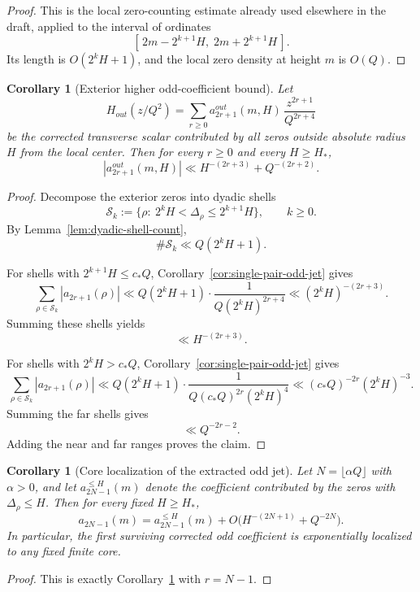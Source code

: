\documentclass[11pt,a4paper]{amsart}
\def\out{out}%
\theoremstyle{plain}
\newtheorem{corollary}[theorem]{Corollary}
\theoremstyle{definition}
\newcommand{\out}{\mathrm{out}}
\begin{document}
\begin{proof}
This is the local zero-counting estimate already used elsewhere in the draft,
applied to the interval of ordinates
\[
[\,2m-2^{k+1}H,\;2m+2^{k+1}H\,].
\]
Its length is $O(2^kH+1)$, and the local zero density at height $m$ is
$O(Q)$.
\end{proof}

\begin{corollary}[Exterior higher odd-coefficient bound]
\label{cor:outside-higher-odd-jets}
Let
\[
H_{\out}(z/Q^2)
=
\sum_{r\ge 0} a_{2r+1}^{\out}(m,H)\,\frac{z^{2r+1}}{Q^{2r+4}}
\]
be the corrected transverse scalar contributed by all zeros outside absolute
radius $H$ from the local center. Then for every $r\ge 0$ and every
$H\ge H_*$,
\[
\boxed{
|a_{2r+1}^{\out}(m,H)|
\ll
H^{-(2r+3)}+Q^{-(2r+2)}.
}
\]
\end{corollary}

\begin{proof}
Decompose the exterior zeros into dyadic shells
\[
\mathcal S_k:=\{\rho:\ 2^kH<\Delta_\rho\le 2^{k+1}H\},
\qquad k\ge 0.
\]
By Lemma~\ref{lem:dyadic-shell-count},
\[
\#\mathcal S_k\ll Q(2^kH+1).
\]

For shells with $2^{k+1}H\le c_*Q$, Corollary~\ref{cor:single-pair-odd-jet}
gives
\[
\sum_{\rho\in\mathcal S_k}|a_{2r+1}(\rho)|
\ll
Q(2^kH+1)\cdot \frac{1}{Q(2^kH)^{2r+4}}
\ll
(2^kH)^{-(2r+3)}.
\]
Summing these shells yields
\[
\ll H^{-(2r+3)}.
\]

For shells with $2^kH>c_*Q$, Corollary~\ref{cor:single-pair-odd-jet} gives
\[
\sum_{\rho\in\mathcal S_k}|a_{2r+1}(\rho)|
\ll
Q(2^kH+1)\cdot \frac{1}{Q(c_*Q)^{2r}(2^kH)^4}
\ll
(c_*Q)^{-2r}(2^kH)^{-3}.
\]
Summing the far shells gives
\[
\ll
Q^{-2r-2}.
\]
Adding the near and far ranges proves the claim.
\end{proof}

\begin{corollary}[Core localization of the extracted odd jet]
\label{cor:extracted-odd-jet-core-localization}
Let $N=\lfloor \alpha Q\rfloor$ with $\alpha>0$, and let
$a_{2N-1}^{\le H}(m)$ denote the coefficient contributed by the zeros with
$\Delta_\rho\le H$. Then for every fixed $H\ge H_*$,
\[
\boxed{
a_{2N-1}(m)
=
a_{2N-1}^{\le H}(m)
+
O\!\bigl(H^{-(2N+1)}+Q^{-2N}\bigr).
}
\]
In particular, the first surviving corrected odd coefficient is exponentially
localized to any fixed finite core.
\end{corollary}

\begin{proof}
This is exactly Corollary~\ref{cor:outside-higher-odd-jets} with $r=N-1$.
\end{proof}
\end{document}
